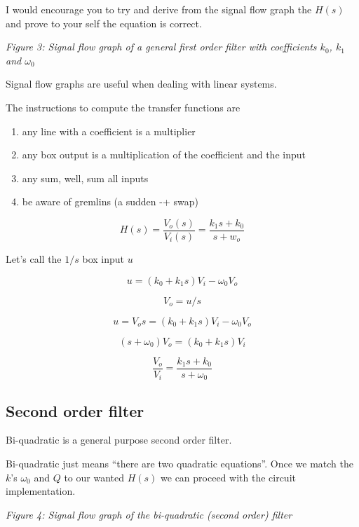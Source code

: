 I would encourage you to try and derive from the signal flow graph the
\(H(s)\) and prove to your self the equation is correct.


{
\centering
{}
}

\emph{Figure 3: Signal flow graph of a general first order filter with
coefficients \(k_0\), \(k_1\) and \(\omega_0\)}

Signal flow graphs are useful when dealing with linear systems.

The instructions to compute the transfer functions are

\begin{enumerate}
\def\labelenumi{\arabic{enumi}.}
\tightlist
\item
  any line with a coefficient is a multiplier
\item
  any box output is a multiplication of the coefficient and the input
\item
  any sum, well, sum all inputs
\item
  be aware of gremlins (a sudden -+ swap)
\end{enumerate}

\[ H(s) =\frac{V_o(s)}{V_i(s)}  = \frac{ k_1 s + k_0 }{s + w_o}\]

Let's call the \(1/s\) box input \(u\)

\[u = (k_0 + k_1s)V_i - \omega_0 V_o\]

\[ V_o = u/s \]

\[ u = V_o s = (k_0 + k_1s)V_i - \omega_0 V_o\]

\[ (s + \omega_0)V_o = (k_0 + k_1s)V_i\]

\[ \frac{V_o}{V_i} = \frac{k_1s + k_0}{s + \omega_0}\]

\subsection{Second order filter}\label{second-order-filter}

Bi-quadratic is a general purpose second order filter.

Bi-quadratic just means ``there are two quadratic equations''. Once we
match the \(k\)'s \(\omega_0\) and \(Q\) to our wanted \(H(s)\) we can
proceed with the circuit implementation.


{
\centering
{}
}

\emph{Figure 4: Signal flow graph of the bi-quadratic (second order)
filter}

